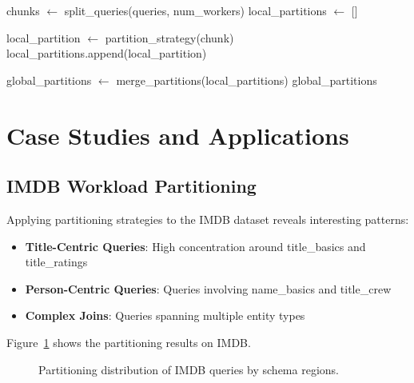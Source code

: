 \begin{algorithm}
\caption{Distributed Partitioning for Large Datasets}
\label{alg:distributed_partitioning}
\begin{algorithmic}[1]
    \State chunks $\gets$ split\_queries(queries, num\_workers)
    \State local\_partitions $\gets$ []
    
    \State {}
        \State local\_partition $\gets$ partition\_strategy(chunk)
        \State local\_partitions.append(local\_partition)
    \EndFor
    
    \State global\_partitions $\gets$ merge\_partitions(local\_partitions)
    \State \Return global\_partitions
\EndProcedure
\end{algorithmic}
\end{algorithm}

\section{Case Studies and Applications}

\subsection{IMDB Workload Partitioning}

Applying partitioning strategies to the IMDB dataset reveals interesting patterns:

\begin{itemize}
    \item \textbf{Title-Centric Queries}: High concentration around title\_basics and title\_ratings
    \item \textbf{Person-Centric Queries}: Queries involving name\_basics and title\_crew
    \item \textbf{Complex Joins}: Queries spanning multiple entity types
\end{itemize}

Figure~\ref{fig:imdb_partitioning} shows the partitioning results on IMDB.

\begin{figure}[h]
\centering
{}
\caption{Partitioning distribution of IMDB queries by schema regions.}
\label{fig:imdb_partitioning}
\end{figure}

